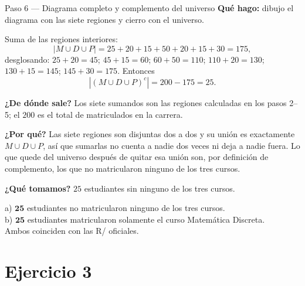 \documentclass[11pt]{article}
\begin{document}
\begin{paso}{Paso 6 --- Diagrama completo y complemento del universo}
\textbf{Qué hago:} dibujo el diagrama con las siete regiones y cierro con el universo.

\begin{center}
\end{center}

Suma de las regiones interiores:
\[
|M\cup D\cup P| = 25+20+15+50+20+15+30 = 175,
\]
desglosando: $25+20=45$; $45+15=60$; $60+50=110$; $110+20=130$; $130+15=145$; $145+30=175$. Entonces
\[
|(M\cup D\cup P)^{c}| = 200-175 = 25 .
\]

\textbf{¿De dónde sale?} Los siete sumandos son las regiones calculadas en los pasos 2--5; el $200$ es el
total de matriculados en la carrera.

\textbf{¿Por qué?} Las siete regiones son disjuntas dos a dos y su unión es exactamente
$M\cup D\cup P$, así que sumarlas no cuenta a nadie dos veces ni deja a nadie fuera. Lo que quede del
universo después de quitar esa unión son, por definición de complemento, los que no matricularon ninguno
de los tres cursos.

\textbf{¿Qué tomamos?} $25$ estudiantes sin ninguno de los tres cursos.
\end{paso}

\begin{resp}
a) $\mathbf{25}$ estudiantes no matricularon ninguno de los tres cursos.\\
b) $\mathbf{25}$ estudiantes matricularon solamente el curso Matemática Discreta.\\
Ambos coinciden con las R/ oficiales.
\end{resp}

\section*{Ejercicio 3}
\end{document}

